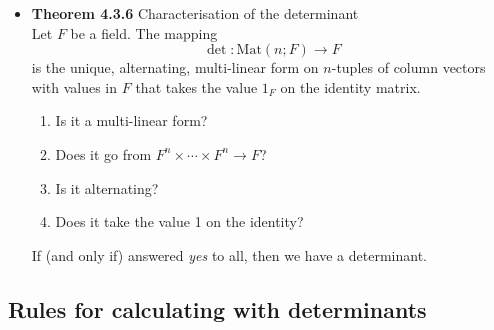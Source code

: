\documentclass[11pt,a4paper]{article}
\begin{document}
\begin{itemize}
    \item \textbf{Theorem 4.3.6} Characterisation of the determinant \\
        Let $F$ be a field.
        The mapping
        \[
            \det : \mathrm{Mat}(n;F) \to F
        \]
        is the unique, alternating, multi-linear form on $n$-tuples of column vectors with
        values in $F$ that takes the value $1_F$ on the identity matrix.
        \begin{enumerate}
            \item Is it a multi-linear form?
            \item Does it go from $F^n \times \cdots \times F^n \to F$?
            \item Is it alternating?
            \item Does it take the value 1 on the identity?
        \end{enumerate}
        If (and only if) answered \emph{yes} to all, then we have a determinant.

\end{itemize}

\subsection{Rules for calculating with determinants}
\end{document}
